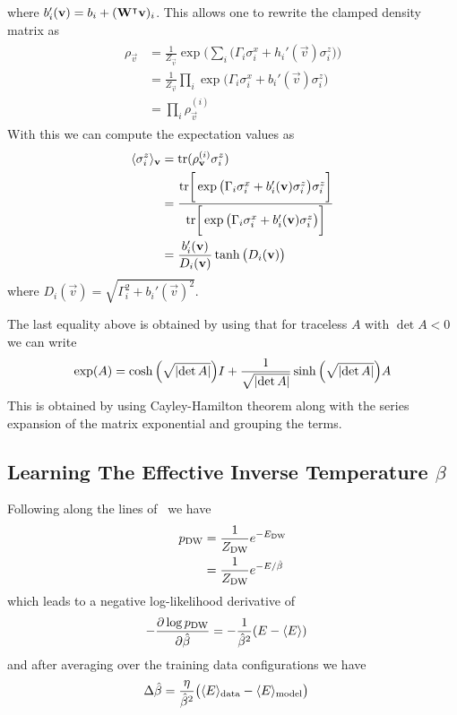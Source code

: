 where \( b_i'(\mathbf{v}) = b_i + (\mathbf{W}^\intercal\mathbf{v})_i \).
This allows one to rewrite the clamped density matrix as
\begin{align}
\begin{split}
    \rho_\vec{v}
        &= \frac{1}{Z_\vec{v}} \exp\bigg( \sum_i \big(\Gamma_i \sigma_i^x + h_i'(\vec{v}) \sigma_i^z\big) \bigg) \\
        &= \frac{1}{Z_\vec{v}} \prod_i \exp \big(\Gamma_i \sigma_i^x + b_i'(\vec{v}) \sigma_i^z\big) \\
        &= \prod_i \rho_\vec{v}^{(i)}
\end{split}
\end{align}
With this we can compute the expectation values as
\begin{align}
\begin{split}
    \langle \sigma_i^z \rangle_{\mathbf{v}}
        &= \text{tr}(\rho_{\mathbf{v}}^{(i)}\sigma_i^z) \\
        &= \frac{\text{tr}\bigg[ \exp \big(\Gamma_i \sigma_i^x + b_i'(\mathbf{v}) \sigma_i^z\big) \sigma_i^z \bigg]}{\text{tr}\bigg[ \exp \big(\Gamma_i \sigma_i^x + b_i'(\mathbf{v}) \sigma_i^z\big) \bigg]} \\
        &= \frac{b_i'(\mathbf{v})}{D_i(\mathbf{v})} \tanh\big(D_i(\mathbf{v})\big)
\end{split}
\end{align}
where \( D_i(\vec{v}) = \sqrt{\Gamma_i^2 + b_i'(\vec{v})^2} \).

The last equality above is obtained by using that for traceless \( A \) with \( \det A < 0 \) we can write
\begin{align}
    \exp(A) = \cosh\Big(\sqrt{\lvert\det A\rvert}\Big) I + \frac{1}{\sqrt{\lvert\det A\rvert}}\sinh\Big(\sqrt{\lvert\det A\rvert}\Big) A
\end{align}
This is obtained by using Cayley-Hamilton theorem along with the series expansion of the matrix exponential and grouping the terms.

\subsection{Learning The Effective Inverse Temperature \( \beta \)}\label{app:learning_beta}
Following along the lines of~\cite{xu_2021} we have
\begin{align}
\begin{split}
    p_\text{DW}
        &= \frac{1}{Z_\text{DW}} e^{-E_\text{DW}} \\
        &= \frac{1}{Z_\text{DW}} e^{-E / \hat{\beta}} \\
\end{split}
\end{align}
which leads to a negative log-likelihood derivative of
\begin{align}
    -\frac{\partial \log p_\text{DW}}{\partial\hat{\beta}}
        &= -\frac{1}{\hat{\beta}^2} (E - \langle E \rangle)
\end{align}
and after averaging over the training data configurations we have
\begin{align}
    \Delta\hat{\beta}
        &= \frac{\eta}{\hat{\beta}^2}\big(\langle E \rangle_\text{data} - \langle E \rangle_\text{model}\big)
\end{align}

